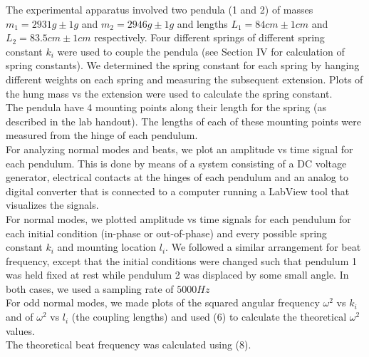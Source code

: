 \documentclass[main.tex]{subfiles}
\begin{document}
The experimental apparatus involved two pendula (1 and 2) of masses $m_1 = 2931 g \pm 1 g$ and $m_2 = 2946 g \pm 1 g$  and lengths $L_1 = 84 cm \pm 1 cm$ and $L_2 = 83.5 cm \pm 1 cm$ respectively. Four different springs of different spring constant $k_i$ were used to couple the pendula (see Section IV for calculation of spring constants). We determined the spring constant for each spring by hanging different weights on each spring and measuring the subsequent extension. Plots of the hung mass vs the extension were used to calculate the spring constant.
\\
The pendula have 4 mounting points along their length for the spring (as described in the lab handout). The lengths of each of these mounting points were measured from the hinge of each pendulum.
\\
For analyzing normal modes and beats, we plot an amplitude vs time signal for each pendulum. This is done by means of a system consisting of a DC voltage generator, electrical contacts at the hinges of each pendulum and an analog to digital converter that is connected to a computer running a LabView tool that visualizes the signals.
\\
For normal modes, we plotted amplitude vs time signals for each pendulum for each initial condition (in-phase or out-of-phase) and every possible spring constant $k_i$ and mounting location $l_i$. We followed a similar arrangement for beat frequency, except that the initial conditions were changed such that pendulum 1 was held fixed at rest while pendulum 2 was displaced by some small angle. In both cases, we used a sampling rate of $5000 Hz$
\\
For odd normal modes, we made plots of the squared angular frequency $\omega^2$ vs $k_i$ and of $\omega^2$ vs $l_i$ (the coupling lengths) and used (6) to calculate the theoretical $\omega^2$ values.
\\
The theoretical beat frequency was calculated using (8).
\end{document}
